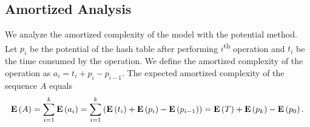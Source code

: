 \subsection{Amortized Analysis}
We analyze the amortized complexity of the model with the potential method. Let $p_i$ be the potential of the hash table after performing $i$\textsuperscript{th} operation and $t_i$ be the time consumed by the operation. We define the amortized complexity of the operation as $a_i = t_i + p_i - p_{i - 1}$. The expected amortized complexity of the sequence $A$ equals
\[
\mathbf{E}\left(A\right) = \sum_{i=1}^{k} \mathbf{E}\left(a_i\right) = \sum_{i = 1}^{k} \left(\mathbf{E}\left(t_i\right) + \mathbf{E}\left(p_i\right) - \mathbf{E}\left(p_{i - 1}\right)\right) = \mathbf{E}\left(T\right) + \mathbf{E}\left(p_k\right) - \mathbf{E}\left(p_0\right).
\]


